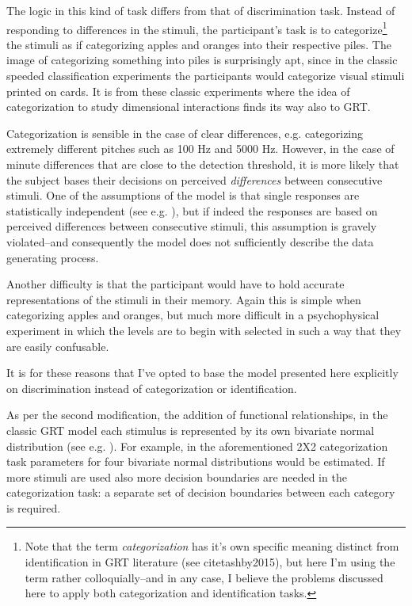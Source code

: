 \documentclass{article}\usepackage{knitr}
\begin{document}
The logic in this kind of task differs from that of discrimination task. Instead of responding to differences in the stimuli, the participant's task is to categorize\footnote{Note that the term \textit{categorization} has it's own specific meaning distinct from identification in GRT literature (see citet{ashby2015}), but here I'm using the term rather colloquially--and in any case, I believe the problems discussed here to apply both categorization and identification tasks.} the stimuli as if categorizing apples and oranges into their respective piles. The image of categorizing something into piles is surprisingly apt, since in the classic speeded classification experiments \citep{garner1974} the participants would categorize visual stimuli printed on cards. It is from these classic experiments where the idea of categorization to study dimensional interactions finds its way also to GRT. 

Categorization is sensible in the case of clear differences, e.g. categorizing extremely different pitches such as 100 Hz and 5000 Hz. However, in the case of minute differences that are close to the detection threshold, it is more likely that the subject bases their decisions on perceived \textit{differences} between consecutive stimuli. One of the assumptions of the model is that single responses are statistically independent (see e.g. \citet[p. 218]{wickens1992}), but if indeed the responses are based on perceived differences between consecutive stimuli, this assumption is gravely violated--and consequently the model does not sufficiently describe the data generating process. 

Another difficulty is that the participant would have to hold accurate representations of the stimuli in their memory. Again this is simple when categorizing apples and oranges, but much more difficult in a psychophysical experiment in which the levels are to begin with selected in such a way that they are easily confusable. 

It is for these reasons that I've opted to base the model presented here explicitly on discrimination instead of categorization or identification.

As per the second modification, the addition of functional relationships, in the classic GRT model each stimulus is represented by its own bivariate  normal distribution (see e.g. \cite{ashby2015}). For example, in the aforementioned 2X2 categorization task parameters for four bivariate normal distributions would be estimated. If more stimuli are used also more decision boundaries are needed in the categorization task: a separate set of decision boundaries between each category is required. 
\end{document}
